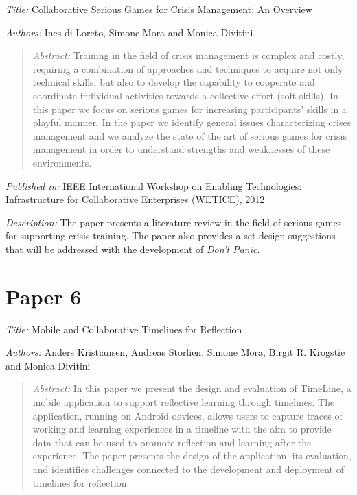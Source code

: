\emph{Title: }Collaborative Serious Games for Crisis Management: An Overview

\emph{Authors: }Ines di Loreto, Simone Mora and Monica Divitini

\begin{quote}
	\emph{Abstract: }Training in the field of crisis management is complex and costly, requiring a combination of approaches and techniques to acquire not only technical skills, but also to develop the capability to cooperate and coordinate individual activities towards a collective effort (soft skills). In this paper we focus on serious games for increasing participants’ skills in a playful manner. In the paper we identify general issues characterizing crises management and we analyze the state of the art of serious games for crisis management in order to understand strengths and weaknesses of these environments.
\end{quote}

\emph{Published in: }IEEE International Workshop on Enabling Technologies: Infrastructure for Collaborative Enterprises (WETICE), 2012

\emph{Description: }The paper presents a literature review in the field of serious games for supporting crisis training. The paper also provides a set design suggestions that will be addressed with the development of \emph{Don't Panic}.

\section*{Paper 6}

\emph{Title: }Mobile and Collaborative Timelines for Reflection

\emph{Authors: }Anders Kristiansen, Andreas Storlien, Simone Mora, Birgit R. Krogstie and Monica Divitini

\begin{quote}
	\emph{Abstract: }In this paper we present the design and evaluation of TimeLine, a mobile application to support reflective learning through timelines. The application, running on Android devices, allows users to capture traces of working and learning experiences in a timeline with the aim to provide data that can be used to promote reflection and learning after the experience. The paper presents the design of the application, its evaluation, and identifies challenges connected to the development and deployment of timelines for reflection.
	
\end{quote}

